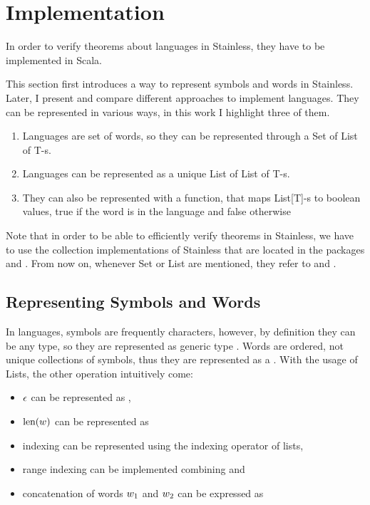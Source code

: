 \section{Implementation}

In order to verify theorems about languages in Stainless, they have to be implemented in Scala. 

This section first introduces a way to represent symbols and words in Stainless. Later, I present and compare different approaches to implement languages. They can be represented in various ways, in this work I highlight three of them.

\begin{enumerate}
	\item Languages are set of words, so they can be represented through a Set of List of T-s.
	\item Languages can be represented as a unique List of List of T-s.
	\item They can also be represented with a function, that maps List[T]-s to boolean values, true if the word is in the language and false otherwise
\end{enumerate}

Note that in order to be able to efficiently verify theorems in Stainless, we have to use the collection implementations of Stainless that are located in the packages  and . From now on, whenever Set or List are mentioned, they refer to  and .

\subsection{Representing Symbols and Words}


In languages, symbols are frequently characters, however, by definition they can be any type, so they are represented as generic type . Words are ordered, not unique collections of symbols, thus they are represented as a . With the usage of Lists, the other operation intuitively come:

\begin{itemize}
	\item $\epsilon$ can be represented as ,
	\item $\text{len}(w)$ can be represented as 
	\item indexing can be represented using the indexing operator of lists,
	\item range indexing can be implemented combining  and 
	\item concatenation of words $w_{1}$ and $w_{2}$ can be expressed as 
\end{itemize}


